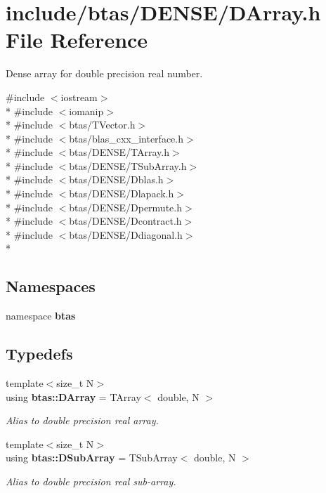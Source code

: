 \section{include/btas/\-D\-E\-N\-S\-E/\-D\-Array.h File Reference}
\label{d3/d5c/DArray_8h}


Dense array for double precision real number.  


{\ttfamily \#include $<$iostream$>$}\\*
{\ttfamily \#include $<$iomanip$>$}\\*
{\ttfamily \#include $<$btas/\-T\-Vector.\-h$>$}\\*
{\ttfamily \#include $<$btas/blas\-\_\-cxx\-\_\-interface.\-h$>$}\\*
{\ttfamily \#include $<$btas/\-D\-E\-N\-S\-E/\-T\-Array.\-h$>$}\\*
{\ttfamily \#include $<$btas/\-D\-E\-N\-S\-E/\-T\-Sub\-Array.\-h$>$}\\*
{\ttfamily \#include $<$btas/\-D\-E\-N\-S\-E/\-Dblas.\-h$>$}\\*
{\ttfamily \#include $<$btas/\-D\-E\-N\-S\-E/\-Dlapack.\-h$>$}\\*
{\ttfamily \#include $<$btas/\-D\-E\-N\-S\-E/\-Dpermute.\-h$>$}\\*
{\ttfamily \#include $<$btas/\-D\-E\-N\-S\-E/\-Dcontract.\-h$>$}\\*
{\ttfamily \#include $<$btas/\-D\-E\-N\-S\-E/\-Ddiagonal.\-h$>$}\\*
\subsection*{Namespaces}
\begin{DoxyCompactItemize}
\item 
namespace {\bf btas}
\end{DoxyCompactItemize}
\subsection*{Typedefs}
\begin{DoxyCompactItemize}
\item 
{\footnotesize template$<$size\-\_\-t N$>$ }\\using {\bf btas\-::\-D\-Array} = T\-Array$<$ double, N $>$
\begin{DoxyCompactList}\small\item\em Alias to double precision real array. \end{DoxyCompactList}\item 
{\footnotesize template$<$size\-\_\-t N$>$ }\\using {\bf btas\-::\-D\-Sub\-Array} = T\-Sub\-Array$<$ double, N $>$
\begin{DoxyCompactList}\small\item\em Alias to double precision real sub-\/array. \end{DoxyCompactList}\end{DoxyCompactItemize}
